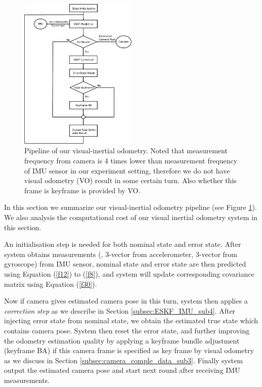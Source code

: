\begin{figure}[b]
    \centering
    \includegraphics[width=0.5\textwidth]{CONTENT/Figure/Figure4-1_Pipeline.png}
    \caption{Pipeline of our visual-inertial odometry. Noted that measurement frequency from camera is 4 times lower than measurement frequency of IMU sensor in our experiment setting, therefore we do not have visual odometry (VO) result in some certain turn. Also whether this frame is keyframe is provided by VO.}
    \label{fig:fig4-1}
\end{figure}


In this section we summarize our visual-inertial odometry pipeline (see Figure \ref{fig:fig4-1}). We also analysis the computational cost of our visual inertial odometry system in this section.

An initialisation step is needed for both nominal state and error state. After system obtains measurements (\eg, 3-vector from accelerometer, 3-vector from gyroscope) from IMU sensor, nominal state and error state are then predicted using Equation (\ref{f12}) to (\ref{f8}), and system will update corresponding covariance matrix using Equation (\ref{f30}). 

Now if camera gives estimated camera pose in this turn, system then applies a \textit{correction step} as we describe in Section \ref{subsec:ESKF_IMU_sub4}. After injecting error state from nominal state, we obtain the estimated true state which contains camera pose. System then reset the error state, and further improving the odometry estimation quality by applying a keyframe bundle adjustment (keyframe BA) if this camera frame is specified as key frame by visual odometry as we discuss in Section \ref{subsec:camera_comple_data_sub3}. Finally system output the estimated camera pose and start next round after receiving IMU measurements.

